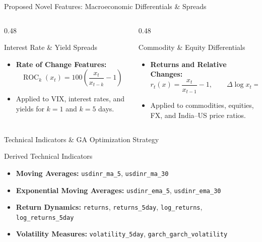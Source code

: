 \documentclass[aspectratio=169]{beamer}
\begin{document}
\begin{frame}{Proposed Novel Features: Macroeconomic Differentials \& Spreads}

	\begin{columns}[T]
		\begin{column}{0.48\textwidth}
			\begin{block}{Interest Rate \& Yield Spreads}
				\begin{itemize}
					\item \textbf{Rate of Change Features:}
						\[
						\operatorname{ROC}_k(x_t) =
						100\left(\frac{x_t}{x_{t-k}} - 1\right)
						\]
					\item Applied to VIX, interest rates, and yields for $k=1$ and $k=5$ days.
				\end{itemize}
			\end{block}
		\end{column}
		\begin{column}{0.48\textwidth}
			\begin{block}{Commodity \& Equity Differentials}
				\begin{itemize}
					\item \textbf{Returns and Relative Changes:}
						\[
						r_t(x) = \frac{x_t}{x_{t-1}} - 1,
						\qquad
						\Delta\log x_t = \log x_t - \log x_{t-1}
						\]
					\item Applied to commodities, equities, FX, and India--US price ratios.
				\end{itemize}
			\end{block}
		\end{column}
	\end{columns}
\end{frame}

\begin{frame}{Technical Indicators \& GA Optimization Strategy}
	\begin{block}{Derived Technical Indicators}
		\begin{itemize}
			\item \textbf{Moving Averages:} \texttt{usdinr\_ma\_5}, \texttt{usdinr\_ma\_30}
			\item \textbf{Exponential Moving Averages:} \texttt{usdinr\_ema\_5}, \texttt{usdinr\_ema\_30}
			\item \textbf{Return Dynamics:} \texttt{returns}, \texttt{returns\_5day}, \texttt{log\_returns}, \texttt{log\_returns\_5day}
			\item \textbf{Volatility Measures:} \texttt{volatility\_5day}, \texttt{garch\_garch\_volatility}
		\end{itemize}
	\end{block}
\end{frame}
\end{document}
